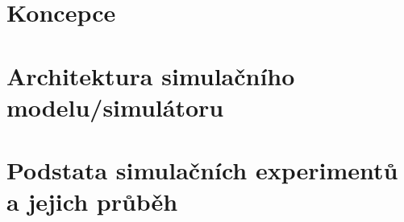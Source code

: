 \documentclass[11pt, a4paper, titlepage]{article}
\begin{document}
\section{Koncepce}


\section{Architektura simulačního modelu/simulátoru}

%

\section{Podstata simulačních experimentů a jejich průběh}
\end{document}
